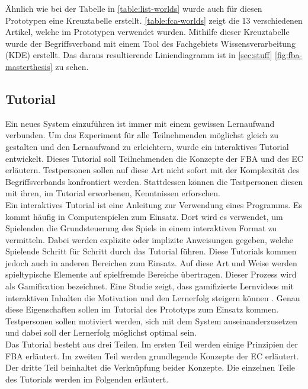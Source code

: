 Ähnlich wie bei der Tabelle in \autoref{table:list-worlds} wurde auch für diesen Prototypen eine Kreuztabelle erstellt.
\autoref{table:fca-worlds} zeigt die 13 verschiedenen Artikel, welche im Prototypen verwendet wurden.
Mithilfe dieser Kreuztabelle wurde der Begriffsverband mit einem Tool des Fachgebiets Wissensverarbeitung (KDE) erstellt.
Das daraus resultierende Liniendiagramm ist in \autoref{sec:stuff} \autoref{fig:fba-masterthesis} zu sehen.

\subsection{Tutorial}
Ein neues System einzuführen ist immer mit einem gewissen Lernaufwand verbunden.
Um das Experiment für alle Teilnehmenden möglichst gleich zu gestalten und den Lernaufwand zu erleichtern, wurde ein interaktives Tutorial entwickelt.
Dieses Tutorial soll Teilnehmenden die Konzepte der \ac{FBA} und des \ac{EC} erläutern.
Testpersonen sollen auf diese Art nicht sofort mit der Komplexität des Begriffsverbands konfrontiert werden.
Stattdessen können die Testpersonen diesen mit ihren, im Tutorial erworbenen, Kenntnissen erforschen.\\

Ein interaktives Tutorial ist eine Anleitung zur Verwendung eines Programms.
Es kommt häufig in Computerspielen zum Einsatz.
Dort wird es verwendet, um Spielenden die Grundsteuerung des Spiels in einem interaktiven Format zu vermitteln.
Dabei werden explizite oder implizite Anweisungen gegeben, welche Spielende Schritt für Schritt durch das Tutorial führen.
Diese Tutorials kommen jedoch auch in anderen Bereichen zum Einsatz.
Auf diese Art und Weise werden spieltypische Elemente auf spielfremde Bereiche übertragen.
Dieser Prozess wird als Gamification bezeichnet.
Eine Studie zeigt, dass gamifizierte Lernvideos mit interaktiven Inhalten die Motivation und den Lernerfolg steigern können \cite{gamification-videos}.
Genau diese Eigenschaften sollen im Tutorial des Prototyps zum Einsatz kommen.
Testpersonen sollen motiviert werden, sich mit dem System auseinanderzusetzen und dabei soll der Lernerfolg möglichst optimal sein.\\

Das Tutorial besteht aus drei Teilen.
Im ersten Teil werden einige Prinzipien der \ac{FBA} erläutert.
Im zweiten Teil werden grundlegende Konzepte der \ac{EC} erläutert.
Der dritte Teil beinhaltet die Verknüpfung beider Konzepte.
Die einzelnen Teile des Tutorials werden im Folgenden erläutert.\\

